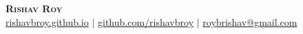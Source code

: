 \documentclass[letterpaper,11pt]{article}
\begin{document}
\begin{center}
    \textbf{\Huge \scshape Rishav Roy} \\ \vspace{1pt}
    \small  
    \href{https://rishavbroy.github.io}{{rishavbroy.github.io}} 
    $|$ \href{https://github.com/rishavbroy}{{github.com/rishavbroy}}
    $|$ \href{mailto:roybrishav@gmail.com}{{roybrishav@gmail.com}}
\end{center}

\vspace{-1mm}

\vspace{-6.5mm}
\end{document}
